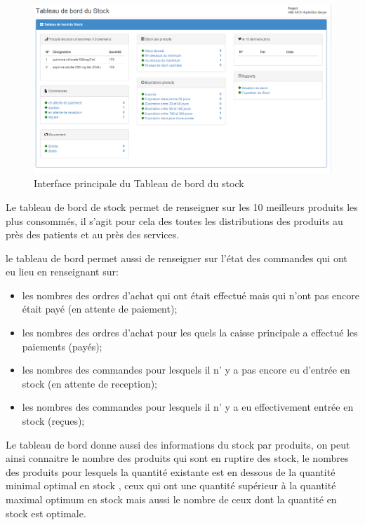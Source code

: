 \documentclass[12pt,a4paper]{report}
\begin{document}
\begin{figure}[h]
\begin{center}
\includegraphics[width=12cm]{pic/TaBordStock.png}
\end{center}
\caption{Interface principale du Tableau de bord du stock}
\label{Interface principale du Tableau de bord du stock}
\end{figure} 

Le tableau de bord de stock permet de renseigner sur les 10 meilleurs produits les plus consommés, il s'agit pour cela des toutes les distributions des produits au près des patients et au près des services. 

le tableau de bord permet aussi de renseigner sur l'état des commandes qui ont eu lieu en renseignant sur:
\begin{itemize}
\item les nombres des ordres d'achat qui ont était effectué mais qui n'ont pas encore était payé (en attente de paiement);
\item les nombres des ordres d'achat pour les quels la caisse principale a effectué les paiements (payés);
\item les nombres des commandes pour lesquels il n' y a pas encore eu d'entrée en stock (en attente de reception);
\item les nombres des commandes pour lesquels il n' y a eu effectivement entrée en stock (reçues);
\end{itemize}

Le tableau de bord donne aussi des informations du stock par produits, on peut ainsi connaitre le nombre des produits qui sont en ruptire des stock, le nombres des produits pour lesquels la quantité existante est en dessous de la quantité minimal optimal en stock , ceux qui ont une quantité supérieur à la quantité maximal optimum en stock mais aussi le nombre de ceux dont la quantité en stock est optimale.
\end{document}
